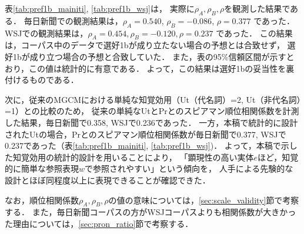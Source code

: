 \documentclass[japanese]{jnlp_1.3e}
\begin{document}
表\ref{tab:pref1b_mainiti}, \ref{tab:pref1b_wsj}は，
実際に$\rho_A, \rho_B, \rho$を観測した結果である．
毎日新聞での観測結果は，$\rho_A = 0.540$, $\rho_B = -0.086$, $\rho = 0.377$ であった．
WSJでの観測結果は，$\rho_A = 0.454, \rho_B = -0.120, \rho = 0.237$ であった．
この結果は，コーパス中のデータで選好1bが成り立たない場合の予想とは合致せず，
選好1bが成り立つ場合の予想と合致していた．
また，表の95\%信頼区間が示すとおり，この値は統計的に有意である．
よって，この結果は選好1bの妥当性を裏付けるものである．

次に，従来のMGCMにおける単純な知覚効用（Ut（代名詞）=2, Ut（非代名詞）=1）との比較のため，
従来の単純なUtとPrとのスピアマン順位相関係数を計測した結果，毎日新聞で0.358, WSJで0.236であった．
一方，本稿で統計的に設計されたUtの場合，Prとのスピアマン順位相関係数が毎日新聞で0.377, WSJで0.237であった（表\ref{tab:pref1b_mainiti}, \ref{tab:pref1b_wsj})．
よって，本稿で示した知覚効用の統計的設計を用いることにより，
「顕現性の高い実体$e$ほど，知覚的に簡単な参照表現$w$で参照されやすい」という傾向を，
人手による先験的な設計とほぼ同程度以上に表現できることが確認できた．

なお，順位相関係数$\rho_A, \rho_B, \rho$の値の意味については，\ref{sec:scale_validity}節で考察する．
また，毎日新聞コーパスの方がWSJコーパスよりも相関係数が大きかった理由については，\ref{sec:pron_ratio}節で考察する．
\end{document}
